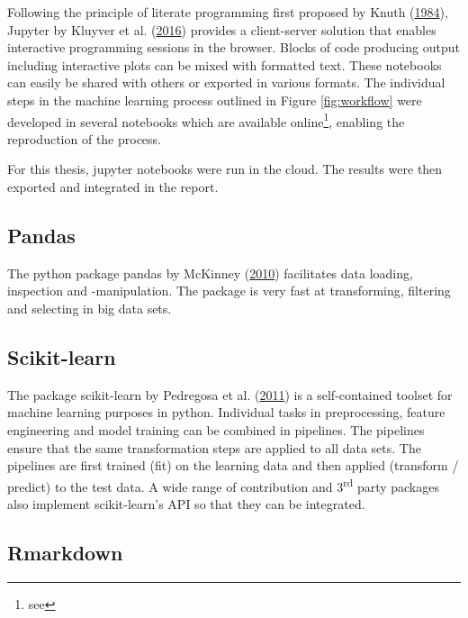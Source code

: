 \documentclass[
  11pt,
  a4paper,
  DIV=12,captions=tableheading,oneside]{scrbook}
\begin{document}
Following the principle of literate programming first proposed by Knuth (\protect\hyperlink{ref-knuth1984literate}{1984}), Jupyter by Kluyver et al. (\protect\hyperlink{ref-Kluyver:2016aa}{2016}) provides a client-server solution that enables interactive programming sessions in the browser. Blocks of code producing output including interactive plots can be mixed with formatted text. These notebooks can easily be shared with others or exported in various formats. The individual steps in the machine learning process outlined in Figure \ref{fig:workflow} were developed in several notebooks which are available online\footnote{see }, enabling the reproduction of the process.

For this thesis, jupyter notebooks were run in the cloud. The results were then exported and integrated in the report.

\hypertarget{pandas}{%
\subsection{Pandas}\label{pandas}}

The python package pandas by McKinney (\protect\hyperlink{ref-mckinney-proc-scipy-2010}{2010}) facilitates data loading, inspection and -manipulation. The package is very fast at transforming, filtering and selecting in big data sets.

\hypertarget{scikit-learn}{%
\subsection{Scikit-learn}\label{scikit-learn}}

The package scikit-learn by Pedregosa et al. (\protect\hyperlink{ref-scikit-learn}{2011}) is a self-contained toolset for machine learning purposes in python. Individual tasks in preprocessing, feature engineering and model training can be combined in pipelines. The pipelines ensure that the same transformation steps are applied to all data sets. The pipelines are first trained (fit) on the learning data and then applied (transform / predict) to the test data. A wide range of contribution and 3\textsuperscript{rd} party packages also implement scikit-learn's API so that they can be integrated.

\hypertarget{rmarkdown}{%
\subsection{Rmarkdown}\label{rmarkdown}}
\end{document}
